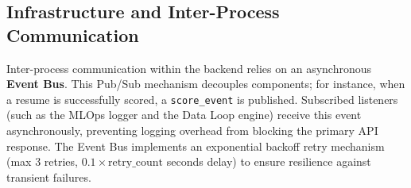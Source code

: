 \subsection{Infrastructure and Inter-Process Communication}
Inter-process communication within the backend relies on an asynchronous \textbf{Event Bus}. This Pub/Sub mechanism decouples components; for instance, when a resume is successfully scored, a \texttt{score\_event} is published. Subscribed listeners (such as the MLOps logger and the Data Loop engine) receive this event asynchronously, preventing logging overhead from blocking the primary API response. The Event Bus implements an exponential backoff retry mechanism (max 3 retries, $0.1 \times \text{retry\_count}$ seconds delay) to ensure resilience against transient failures.

